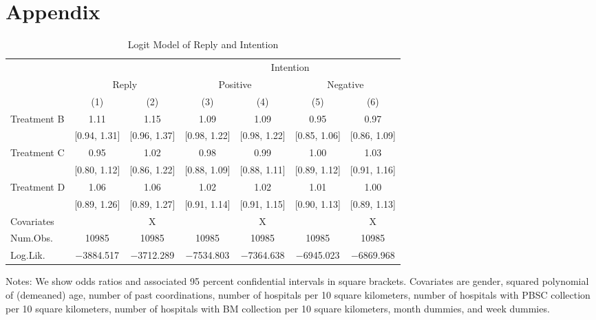 \documentclass[
]{article}
\begin{document}
\clearpage

\hypertarget{appendix}{%
\section*{Appendix}\label{appendix}}

\begin{table}[H]

\caption{\label{tab:logit-stock}Logit Model of Reply and Intention}
\centering
\fontsize{9}{11}\selectfont
\begin{threeparttable}
\begin{tabular}[t]{lcccccc}
\toprule
\multicolumn{3}{c}{ } & \multicolumn{4}{c}{Intention} \\
\cmidrule(l{3pt}r{3pt}){4-7}
\multicolumn{1}{c}{ } & \multicolumn{2}{c}{Reply} & \multicolumn{2}{c}{Positive} & \multicolumn{2}{c}{Negative} \\
\cmidrule(l{3pt}r{3pt}){2-3} \cmidrule(l{3pt}r{3pt}){4-5} \cmidrule(l{3pt}r{3pt}){6-7}
  & (1) & (2) & (3) & (4) & (5) & (6)\\
\midrule
Treatment B & \num{1.11} & \num{1.15} & \num{1.09} & \num{1.09} & \num{0.95} & \num{0.97}\\
 & {}[\num{0.94}, \num{1.31}] & {}[\num{0.96}, \num{1.37}] & {}[\num{0.98}, \num{1.22}] & {}[\num{0.98}, \num{1.22}] & {}[\num{0.85}, \num{1.06}] & {}[\num{0.86}, \num{1.09}]\\
Treatment C & \num{0.95} & \num{1.02} & \num{0.98} & \num{0.99} & \num{1.00} & \num{1.03}\\
 & {}[\num{0.80}, \num{1.12}] & {}[\num{0.86}, \num{1.22}] & {}[\num{0.88}, \num{1.09}] & {}[\num{0.88}, \num{1.11}] & {}[\num{0.89}, \num{1.12}] & {}[\num{0.91}, \num{1.16}]\\
Treatment D & \num{1.06} & \num{1.06} & \num{1.02} & \num{1.02} & \num{1.01} & \num{1.00}\\
 & {}[\num{0.89}, \num{1.26}] & {}[\num{0.89}, \num{1.27}] & {}[\num{0.91}, \num{1.14}] & {}[\num{0.91}, \num{1.15}] & {}[\num{0.90}, \num{1.13}] & {}[\num{0.89}, \num{1.13}]\\
\midrule
Covariates &  & X &  & X &  & X\\
Num.Obs. & \num{10985} & \num{10985} & \num{10985} & \num{10985} & \num{10985} & \num{10985}\\
Log.Lik. & \num{-3884.517} & \num{-3712.289} & \num{-7534.803} & \num{-7364.638} & \num{-6945.023} & \num{-6869.968}\\
\bottomrule
\end{tabular}
\begin{tablenotes}
\item Notes: We show odds ratios and associated 95 percent confidential intervals in square brackets. Covariates are gender, squared polynomial of (demeaned) age, number of past coordinations, number of hospitals per 10 square kilometers, number of hospitals with PBSC collection per 10 square kilometers, number of hospitals with BM collection per 10 square kilometers, month dummies, and week dummies.
\end{tablenotes}
\end{threeparttable}
\end{table}
\end{document}
